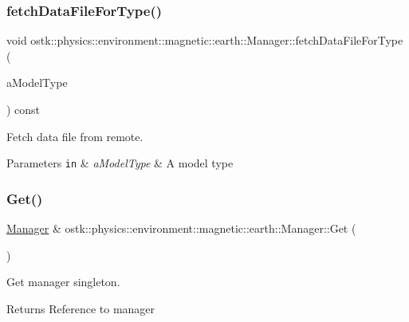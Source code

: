 \subsubsection{\texorpdfstring{fetch\+Data\+File\+For\+Type()}{fetchDataFileForType()}}
{\footnotesize\ttfamily void ostk\+::physics\+::environment\+::magnetic\+::earth\+::\+Manager\+::fetch\+Data\+File\+For\+Type (\begin{DoxyParamCaption}\item[{const \hyperlink{classostk_1_1physics_1_1environment_1_1magnetic_1_1_earth_a30a064d87b6fce338e76aebd3043b6b6}{Earth\+Magnetic\+Model\+::\+Type} \&}]{a\+Model\+Type }\end{DoxyParamCaption}) const}



Fetch data file from remote. 


\begin{DoxyParams}[1]{Parameters}
\mbox{\tt in}  & {\em a\+Model\+Type} & A model type \\
\hline
\end{DoxyParams}
\mbox{\label{classostk_1_1physics_1_1environment_1_1magnetic_1_1earth_1_1_manager_a28a3c063a2d679f800f03b6763e13c73}} 
\subsubsection{\texorpdfstring{Get()}{Get()}}
{\footnotesize\ttfamily \hyperlink{classostk_1_1physics_1_1environment_1_1magnetic_1_1earth_1_1_manager}{Manager} \& ostk\+::physics\+::environment\+::magnetic\+::earth\+::\+Manager\+::\+Get (\begin{DoxyParamCaption}{ }\end{DoxyParamCaption})\hspace{0.3cm}{\ttfamily [static]}}



Get manager singleton. 

\begin{DoxyReturn}{Returns}
Reference to manager 
\end{DoxyReturn}
\mbox{\label{classostk_1_1physics_1_1environment_1_1magnetic_1_1earth_1_1_manager_aa3181b328abeb45f518f78b682f83d04}} 
